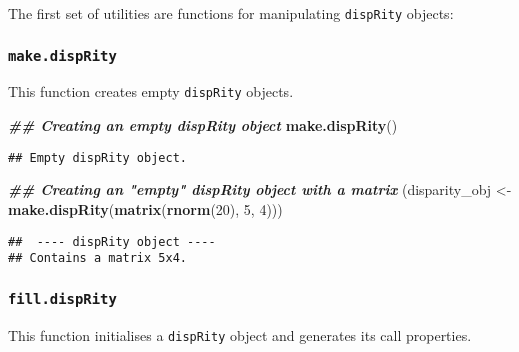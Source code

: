 \documentclass[
]{book}
\newenvironment{Shaded}{\begin{snugshade}}{\end{snugshade}}
\newcommand{\DecValTok}[1]{\textcolor[rgb]{0.00,0.00,0.81}{#1}}
\newcommand{\DocumentationTok}[1]{\textcolor[rgb]{0.56,0.35,0.01}{\textbf{\textit{#1}}}}
\newcommand{\FunctionTok}[1]{\textcolor[rgb]{0.13,0.29,0.53}{\textbf{#1}}}
\newcommand{\NormalTok}[1]{#1}
\newcommand{\OtherTok}[1]{\textcolor[rgb]{0.56,0.35,0.01}{#1}}
\newcommand{\SpecialCharTok}[1]{\textcolor[rgb]{0.81,0.36,0.00}{\textbf{#1}}}
\begin{document}
The first set of utilities are functions for manipulating \texttt{dispRity} objects:

\hypertarget{make.disprity}{%
\subsubsection{\texorpdfstring{\texttt{make.dispRity}}{make.dispRity}}\label{make.disprity}}

This function creates empty \texttt{dispRity} objects.

\begin{Shaded}
\begin{Highlighting}[]
\DocumentationTok{\#\# Creating an empty dispRity object}
\FunctionTok{make.dispRity}\NormalTok{()}
\end{Highlighting}
\end{Shaded}

\begin{verbatim}
## Empty dispRity object.
\end{verbatim}

\begin{Shaded}
\begin{Highlighting}[]
\DocumentationTok{\#\# Creating an "empty" dispRity object with a matrix}
\NormalTok{(disparity\_obj }\OtherTok{\textless{}{-}} \FunctionTok{make.dispRity}\NormalTok{(}\FunctionTok{matrix}\NormalTok{(}\FunctionTok{rnorm}\NormalTok{(}\DecValTok{20}\NormalTok{), }\DecValTok{5}\NormalTok{, }\DecValTok{4}\NormalTok{)))}
\end{Highlighting}
\end{Shaded}

\begin{verbatim}
##  ---- dispRity object ---- 
## Contains a matrix 5x4.
\end{verbatim}

\hypertarget{fill.disprity}{%
\subsubsection{\texorpdfstring{\texttt{fill.dispRity}}{fill.dispRity}}\label{fill.disprity}}

This function initialises a \texttt{dispRity} object and generates its call properties.

\begin{Shaded}
\end{Shaded}
\end{document}
